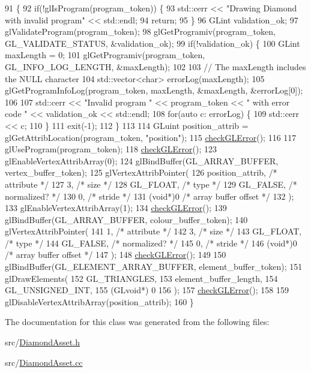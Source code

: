 \begin{DoxyCode}
91                                             \{
92   \textcolor{keywordflow}{if}(!glIsProgram(program\_token)) \{
93     std::cerr << \textcolor{stringliteral}{"Drawing Diamond with invalid program"} << std::endl;
94     \textcolor{keywordflow}{return};
95   \}
96   GLint validation\_ok;
97   glValidateProgram(program\_token);
98   glGetProgramiv(program\_token, GL\_VALIDATE\_STATUS, &validation\_ok);
99   \textcolor{keywordflow}{if}(!validation\_ok) \{
100     GLint maxLength = 0;
101     glGetProgramiv(program\_token, GL\_INFO\_LOG\_LENGTH, &maxLength);
102 
103     \textcolor{comment}{// The maxLength includes the NULL character}
104     std::vector<char> errorLog(maxLength);
105     glGetProgramInfoLog(program\_token, maxLength, &maxLength, &errorLog[0]);
106 
107     std::cerr << \textcolor{stringliteral}{"Invalid program "} << program\_token << \textcolor{stringliteral}{" with error code "} << validation\_ok << std::endl;
108     \textcolor{keywordflow}{for}(\textcolor{keyword}{auto} c: errorLog) \{
109       std::cerr << c;
110     \}
111     exit(-1);
112   \}
113 
114   GLuint position\_attrib = glGetAttribLocation(program\_token, \textcolor{stringliteral}{"position"});
115   \hyperlink{DiamondAsset_8cc_a75f201b0e53e68726854997957322b8d}{checkGLError}();
116 
117   glUseProgram(program\_token);
118   \hyperlink{DiamondAsset_8cc_a75f201b0e53e68726854997957322b8d}{checkGLError}();
123   glEnableVertexAttribArray(0);
124   glBindBuffer(GL\_ARRAY\_BUFFER, vertex\_buffer\_token);
125   glVertexAttribPointer(
126     position\_attrib,        \textcolor{comment}{/* attribute */}
127     3,        \textcolor{comment}{/* size */}
128     GL\_FLOAT,   \textcolor{comment}{/* type */}
129     GL\_FALSE,   \textcolor{comment}{/* normalized? */}
130     0,        \textcolor{comment}{/* stride */}
131     (\textcolor{keywordtype}{void}*)0    \textcolor{comment}{/* array buffer offset */}
132   );
133   glEnableVertexAttribArray(1);
134   \hyperlink{DiamondAsset_8cc_a75f201b0e53e68726854997957322b8d}{checkGLError}();
139   glBindBuffer(GL\_ARRAY\_BUFFER, colour\_buffer\_token);
140   glVertexAttribPointer(
141     1,        \textcolor{comment}{/* attribute */}
142     3,        \textcolor{comment}{/* size */}
143     GL\_FLOAT,   \textcolor{comment}{/* type */}
144     GL\_FALSE,   \textcolor{comment}{/* normalized? */}
145     0,        \textcolor{comment}{/* stride */}
146     (\textcolor{keywordtype}{void}*)0    \textcolor{comment}{/* array buffer offset */}
147   );
148   \hyperlink{DiamondAsset_8cc_a75f201b0e53e68726854997957322b8d}{checkGLError}();
149 
150   glBindBuffer(GL\_ELEMENT\_ARRAY\_BUFFER, element\_buffer\_token);
151   glDrawElements(
152     GL\_TRIANGLES,
153     element\_buffer\_length,
154     GL\_UNSIGNED\_INT,
155     (GLvoid*) 0
156   );
157   \hyperlink{DiamondAsset_8cc_a75f201b0e53e68726854997957322b8d}{checkGLError}();
158 
159   glDisableVertexAttribArray(position\_attrib);
160 \}
\end{DoxyCode}


The documentation for this class was generated from the following files\+:\begin{DoxyCompactItemize}
\item 
src/\hyperlink{DiamondAsset_8h}{Diamond\+Asset.\+h}\item 
src/\hyperlink{DiamondAsset_8cc}{Diamond\+Asset.\+cc}\end{DoxyCompactItemize}
